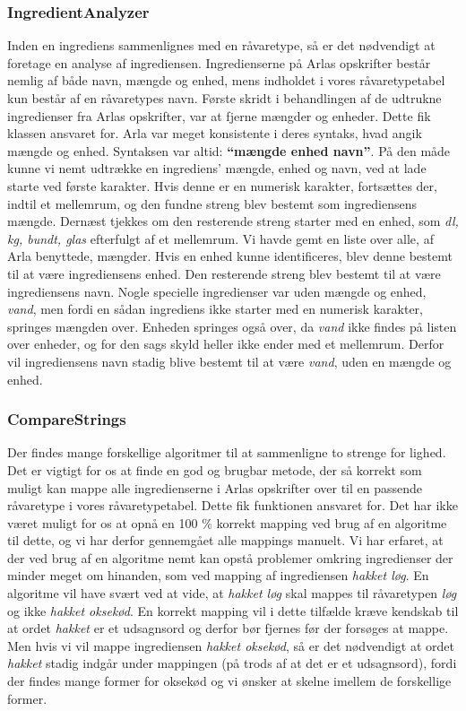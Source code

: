 \subsubsection{IngredientAnalyzer}
Inden en ingrediens sammenlignes med en råvaretype, så er det nødvendigt at foretage en analyse af ingrediensen. Ingredienserne på Arlas opskrifter består nemlig af både navn, mængde og enhed, mens indholdet i vores råvaretypetabel kun består af en råvaretypes navn. Første skridt i behandlingen af de udtrukne ingredienser fra Arlas opskrifter, var at fjerne mængder og enheder. Dette fik klassen  ansvaret for. Arla var meget konsistente i deres syntaks, hvad angik mængde og enhed. Syntaksen var altid: \textbf{``mængde enhed navn''}.
På den måde kunne vi nemt udtrække en ingrediens' mængde, enhed og navn, ved at lade  starte ved første karakter. Hvis denne er en numerisk karakter, fortsættes der, indtil et mellemrum, og den fundne streng blev bestemt som ingrediensens mængde. Dernæst tjekkes om den resterende streng starter med en enhed, som \fx \textit{dl, kg, bundt, glas} efterfulgt af et mellemrum. Vi havde gemt en liste over alle, af Arla benyttede, mængder. Hvis en enhed kunne identificeres, blev denne bestemt til at være ingrediensens enhed. Den resterende streng blev bestemt til at være ingrediensens navn.
Nogle specielle ingredienser var uden mængde og enhed, \fx \textit{vand}, men fordi en sådan ingrediens ikke starter med en numerisk karakter, springes mængden over. Enheden springes også over, da \textit{vand} ikke findes på listen over enheder, og for den sags skyld heller ikke ender med et mellemrum. Derfor vil ingrediensens navn stadig blive bestemt til at være \textit{vand}, uden en mængde og enhed.

\subsubsection{CompareStrings}
Der findes mange forskellige algoritmer til at sammenligne to strenge for lighed. Det er vigtigt for os at finde en god og brugbar metode, der så korrekt som muligt kan mappe alle ingredienserne i Arlas opskrifter over til en passende råvaretype i vores råvaretypetabel. Dette fik funktionen  ansvaret for. Det har ikke været muligt for os at opnå en 100 \% korrekt mapping ved brug af en algoritme til dette, og vi har derfor gennemgået alle mappings manuelt. Vi har erfaret, at der ved brug af en algoritme nemt kan opstå problemer omkring ingredienser der minder meget om hinanden, som \fx ved mapping af ingrediensen \textit{hakket løg}. En algoritme vil have svært ved at vide, at \textit{hakket løg} skal mappes til råvaretypen \textit{løg} og ikke \textit{hakket oksekød}. En korrekt mapping vil i dette tilfælde kræve kendskab til at ordet \textit{hakket} er et udsagnsord og derfor bør fjernes før der forsøges at mappe. Men hvis vi vil mappe ingrediensen \textit{hakket oksekød}, så er det nødvendigt at ordet \textit{hakket} stadig indgår under mappingen (på trods af at det er et udsagnsord), fordi der findes mange former for oksekød og vi ønsker at skelne imellem de forskellige former.

